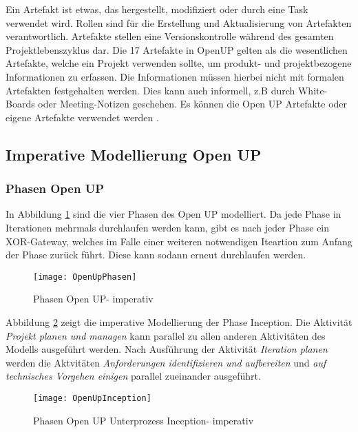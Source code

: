 Ein Artefakt ist etwas, das hergestellt, modifiziert oder durch eine Task verwendet wird. Rollen sind 
für die Erstellung und Aktualisierung von Artefakten verantwortlich. Artefakte stellen eine Versionskontrolle während des gesamten Projektlebenszyklus dar. Die 17 Artefakte in OpenUP gelten als die wesentlichen Artefakte, welche ein Projekt verwenden sollte, um produkt- und projektbezogene Informationen zu erfassen. Die Informationen müssen hierbei nicht mit formalen Artefakten festgehalten werden. Dies kann auch informell, z.B durch White-Boards oder Meeting-Notizen geschehen. Es können die Open UP Artefakte oder eigene Artefakte verwendet werden \cite{eclipseopenup}.

\subsection{Imperative Modellierung Open UP}

 \subsubsection{Phasen Open UP}

In Abbildung \ref{fig:OpenUpPhasen} sind die vier Phasen des Open UP modelliert. Da jede Phase in Iterationen mehrmals durchlaufen werden kann, gibt es nach jeder Phase ein XOR-Gateway, welches im Falle einer weiteren notwendigen Iteartion zum Anfang der Phase zurück führt. Diese kann sodann erneut durchlaufen werden.

\begin{figure}[htp]
\begin{center}
  \texttt{[image: OpenUpPhasen]} %
  \caption{Phasen Open UP- imperativ}
  \label{fig:OpenUpPhasen}
\end{center}
\end{figure}

Abbildung \ref{fig:OpenUpInception} zeigt die imperative Modellierung der Phase Inception. Die Aktivität \textit{Projekt planen und managen} kann parallel zu allen anderen Aktivitäten des Modells ausgeführt werden.\newline
Nach Ausführung der Aktivität \textit{Iteration planen} werden die Aktvitäten \textit{Anforderungen identifizieren und aufbereiten} und \textit{auf technisches Vorgehen einigen} parallel zueinander ausgeführt.

\begin{figure}[htp]
\begin{center}
  \texttt{[image: OpenUpInception]} %
  \caption{Phasen Open UP Unterprozess Inception- imperativ}
  \label{fig:OpenUpInception}
\end{center}
\end{figure}

